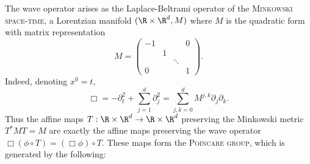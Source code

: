 \documentclass[reqno]{amsart}
\theoremstyle{definition}
\theoremstyle{remark}
\renewcommand{\emph}{\textsc}
\begin{document}
The wave operator arises as the Laplace-Beltrami operator of the \emph{Minkowski space-time}, a Lorentzian manifold $(\R \times \R^d, M)$ where $M$ is the quadratic form with matrix representation 
	\[ 
		M 
		=
		\begin{pmatrix}
			-1	& 		& 			&0 \\
				& 1	&			&  \\
				&		&\ddots 	&  \\
			0	&		& 			&1
		\end{pmatrix}.
	\]
Indeed, denoting $x^0 = t$, 
	\[ \Box = -\partial_t^2 + \sum_{j = 1}^d \partial_j^2 = \sum_{j, k = 0}^d M^{j, k} \partial_j \partial_k. \]		
Thus the affine maps $T: \R \times \R^d \to \R \times \R^d$ preserving the Minkowski metric $T^* M T = M$ are exactly the affine maps preserving the wave operator $\Box (\phi \circ T) = (\Box \phi) \circ T$. These maps form the \emph{Poincare group}, which is generated by the following:
\end{document}
